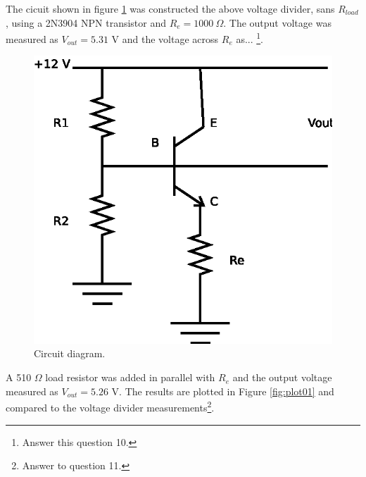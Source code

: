 \documentclass[11pt,onecolumn]{article}
\begin{document}
The cicuit shown in figure \ref{fig:diagram3} was constructed the above voltage divider, sans $R_{load}$, using a 2N3904 NPN transistor and $R_e =1000\ \Omega$. The output voltage was measured as $V_{out} = 5.31$ V and the voltage across $R_e$ as... \footnote{Answer this question 10.}.
%
%
\begin{figure}
\begin{center}
\includegraphics{Diagram3.eps}
\end{center}
\caption{Circuit diagram.}\label{fig:diagram3}
\end{figure}

A 510 $\Omega$ load resistor was added in parallel with $R_e$ and the output voltage measured as $V_{out} = 5.26$ V. The results are plotted in Figure \ref{fig:plot01} and compared to the voltage divider measurements\footnote{Answer to question 11.}.

\end{document}

